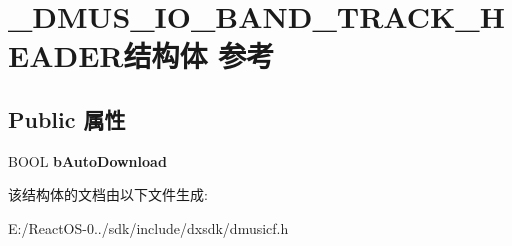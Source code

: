 \hypertarget{struct___d_m_u_s___i_o___b_a_n_d___t_r_a_c_k___h_e_a_d_e_r}{}\section{\+\_\+\+D\+M\+U\+S\+\_\+\+I\+O\+\_\+\+B\+A\+N\+D\+\_\+\+T\+R\+A\+C\+K\+\_\+\+H\+E\+A\+D\+E\+R结构体 参考}
\label{struct___d_m_u_s___i_o___b_a_n_d___t_r_a_c_k___h_e_a_d_e_r}
\subsection*{Public 属性}
\begin{DoxyCompactItemize}
\item 
\mbox{\label{struct___d_m_u_s___i_o___b_a_n_d___t_r_a_c_k___h_e_a_d_e_r_ac63c38abced34cb0ea7621d7b078bca8}} 
B\+O\+OL {\bfseries b\+Auto\+Download}
\end{DoxyCompactItemize}


该结构体的文档由以下文件生成\+:\begin{DoxyCompactItemize}
\item 
E\+:/\+React\+O\+S-\/0../sdk/include/dxsdk/dmusicf.\+h\end{DoxyCompactItemize}
